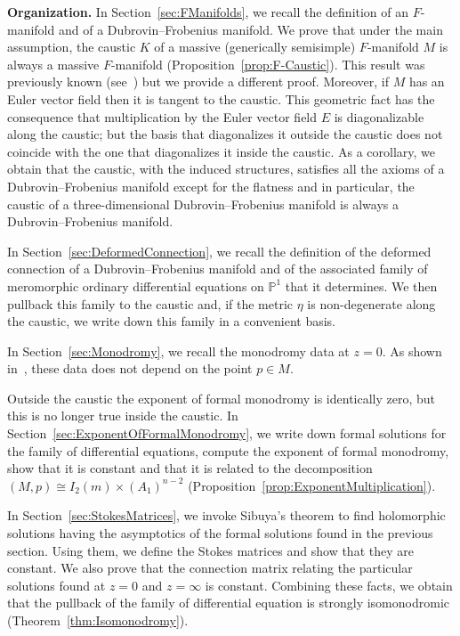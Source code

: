 \documentclass[pdftex]{sigma}
\numberwithin{equation}{section}
\begin{document}
\textbf{Organization.} In Section~\ref{sec:FManifolds}, we recall the definition of an $F$-manifold and of a Dubrovin--Frobenius manifold. We prove that under the main assumption, the caustic $K$ of a massive (generically semisimple) $F$-manifold $M$ is always a massive $F$-manifold (Proposition~\ref{prop:F-Caustic}). This result was previously known (see~\cite[Theorem~2.10 and Example 2.5]{Strachan_2004}) but we provide a different proof. Moreover, if $M$ has an Euler vector field then it is tangent to the caustic. This geometric fact has the consequence that multiplication by the Euler vector field $E$ is diagonalizable along the caustic; but the basis that diagonalizes it outside the caustic does not coincide with the one that diagonalizes it inside the caustic. As a corollary, we obtain that the caustic, with the induced structures, satisfies all the axioms of a Dubrovin--Frobenius manifold except for the flatness and in particular, the caustic of a three-dimensional Dubrovin--Frobenius manifold is always a Dubrovin--Frobenius manifold.

In Section~\ref{sec:DeformedConnection}, we recall the definition of the deformed connection of a Dubrovin--Frobenius manifold and of the associated family of meromorphic ordinary differential equations on $\mathbb{P}^{1}$ that it determines. We then pullback this family to the caustic and, if the metric $\eta$ is non-degenerate along the caustic, we write down this family in a convenient basis.

In Section~\ref{sec:Monodromy}, we recall the monodromy data at $z=0$. As shown in~\cite{Dubrovin:1998fe}, these data does not depend on the point $p\in M$.

Outside the caustic the exponent of formal monodromy is identically zero, but this is no longer true inside the caustic. In Section~\ref{sec:ExponentOfFormalMonodromy}, we write down formal solutions for the family of differential equations, compute the exponent of formal monodromy, show that it is constant and that it is related to the decomposition $(M,p)\cong I_{2}(m)\times (A_{1})^{n-2}$ (Proposition~\ref{prop:ExponentMultiplication}).

In Section~\ref{sec:StokesMatrices}, we invoke Sibuya's theorem to find holomorphic solutions having the asymptotics of the formal solutions found in the previous section. Using them, we define the Stokes matrices and show that they are constant. We also prove that the connection matrix relating the particular solutions found at $z=0$ and $z=\infty$ is constant. Combining these facts, we obtain that the pullback of the family of differential equation is strongly isomonodromic (Theorem~\ref{thm:Isomonodromy}).
\end{document}
